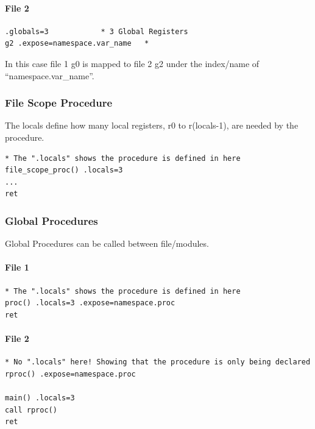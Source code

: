 \hypertarget{file-2}{%
\paragraph{File 2}\label{file-2}}

\begin{verbatim}
.globals=3            * 3 Global Registers
g2 .expose=namespace.var_name   * 
\end{verbatim}

In this case file 1 g0 is mapped to file 2 g2 under the index/name of
``namespace.var\_name''.

\hypertarget{file-scope-procedure}{%
\subsubsection{File Scope Procedure}\label{file-scope-procedure}}

The locals define how many local registers, r0 to r(locals-1), are
needed by the procedure.

\begin{verbatim}
* The ".locals" shows the procedure is defined in here
file_scope_proc() .locals=3
...
ret
\end{verbatim}

\hypertarget{global-procedures}{%
\subsubsection{Global Procedures}\label{global-procedures}}

Global Procedures can be called between file/modules.

\hypertarget{file-1-1}{%
\paragraph{File 1}\label{file-1-1}}

\begin{verbatim}
* The ".locals" shows the procedure is defined in here
proc() .locals=3 .expose=namespace.proc
ret
\end{verbatim}

\hypertarget{file-2-1}{%
\paragraph{File 2}\label{file-2-1}}

\begin{verbatim}
* No ".locals" here! Showing that the procedure is only being declared 
rproc() .expose=namespace.proc

main() .locals=3 
call rproc()
ret
\end{verbatim}

